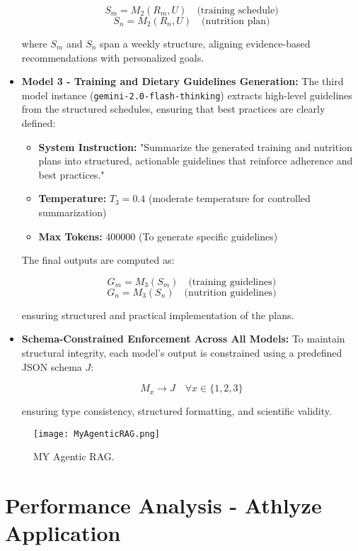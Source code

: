 \documentclass[conference]{IEEEtran}
\begin{document}
\begin{itemize}
    \[
    S_m = M_2(R_m, U) \quad \text{(training schedule)}
    \]
    \[
    S_n = M_2(R_n, U) \quad \text{(nutrition plan)}
    \]

    where $S_m$ and $S_n$ span a weekly structure, aligning evidence-based recommendations with personalized goals.

    \item \textbf{Model 3 - Training and Dietary Guidelines Generation:}  
    The third model instance (\texttt{gemini-2.0-flash-thinking}) extracts high-level guidelines from the structured schedules, ensuring that best practices are clearly defined:

    \begin{itemize}
        \item \textbf{System Instruction:} "Summarize the generated training and nutrition plans into structured, actionable guidelines that reinforce adherence and best practices."
        \item \textbf{Temperature:} $T_3 = 0.4$ (moderate temperature for controlled summarization)
        \item \textbf{Max Tokens:} 400000 (To generate specific guidelines)
    \end{itemize}

    The final outputs are computed as:

    \[
    G_m = M_3(S_m) \quad \text{(training guidelines)}
    \]
    \[
    G_n = M_3(S_n) \quad \text{(nutrition guidelines)}
    \]

    ensuring structured and practical implementation of the plans.

    \item \textbf{Schema-Constrained Enforcement Across All Models:}  
    To maintain structural integrity, each model's output is constrained using a predefined JSON schema $J$:

    \[
    M_x \rightarrow J \quad \forall x \in \{1, 2, 3\}
    \]

    ensuring type consistency, structured formatting, and scientific validity.
\end{itemize}

\begin{figure}[h!]
    \centering
    \texttt{[image: MyAgenticRAG.png]}
    \caption{MY Agentic RAG.}
    \label{fig:RAG}
\end{figure}

\section{Performance Analysis - Athlyze Application}
\end{document}
